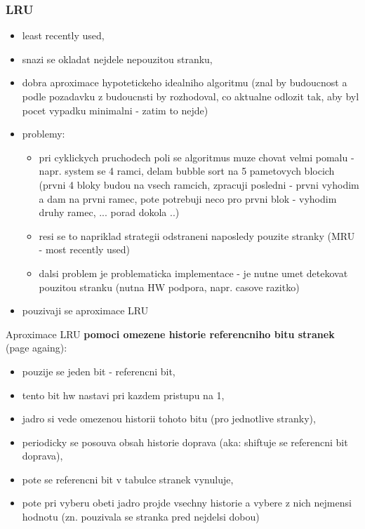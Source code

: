 \documentclass[a4paper, 11pt]{article}
\begin{document}
\subsubsection{LRU}
\begin{itemize}
    \item least recently used,
    \item snazi se okladat nejdele nepouzitou stranku,
    \item dobra aproximace hypotetickeho idealniho algoritmu (znal by budoucnost a podle pozadavku z budoucnsti by rozhodoval, co aktualne odlozit tak, aby byl pocet vypadku minimalni - zatim to nejde)
    \item problemy:
    \begin{itemize}
        \item pri cyklickych pruchodech poli se algoritmus muze chovat velmi pomalu - napr. system se 4 ramci, delam bubble sort na 5 pametovych blocich (prvni 4 bloky budou na vsech ramcich, zpracuji posledni - prvni vyhodim a dam na prvni ramec, pote potrebuji neco pro prvni blok - vyhodim druhy ramec, ... porad dokola ..)
    \item resi se to napriklad strategii odstraneni naposledy pouzite stranky (MRU - most recently used)
    \item dalsi problem je problematicka implementace - je nutne umet detekovat pouzitou stranku (nutna HW podpora, napr. casove razitko)
    \end{itemize}
    \item pouzivaji se aproximace LRU \\
\end{itemize}

Aproximace LRU \textbf{pomoci omezene historie referencniho bitu stranek} (page againg):
\begin{itemize}
    \item pouzije se jeden bit - referencni bit,
    \item tento bit hw nastavi pri kazdem pristupu na 1,
    \item jadro si vede omezenou historii tohoto bitu (pro jednotlive stranky),
    \item periodicky se posouva obsah historie doprava (aka: shiftuje se referencni bit doprava),
    \item pote se referencni bit v tabulce stranek vynuluje,
    \item pote pri vyberu obeti jadro projde vsechny historie a vybere z nich nejmensi hodnotu (zn. pouzivala se stranka pred nejdelsi dobou) \\
\end{itemize}
\end{document}
